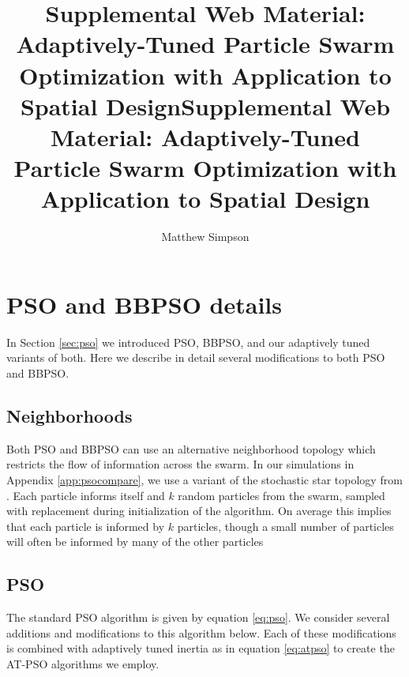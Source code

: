 \documentclass[cmbright]{staauth}
\begin{document}
\blind
{
  \title{Supplemental Web Material: Adaptively-Tuned Particle Swarm Optimization with Application to Spatial Design}
  \author{Matthew Simpson}
  \address{Department of Statistics, University of Missouri,\\
    146 Middlebush Hall, Columbia, MO 65211-6100}
  \received{}
  \accepted{}

}\fi
{}\blind
{
  \title{Supplemental Web Material: Adaptively-Tuned Particle Swarm Optimization with Application to Spatial Design}
  \author{}
  \address{}
  \corremail{}
  \received{}
  \accepted{}

}\fi

\maketitle

\appendix
\section{PSO and BBPSO details}\label{app:psodetail}

In Section \ref{sec:pso} we introduced PSO, BBPSO, and our adaptively tuned variants of both. Here we describe in detail several modifications to both PSO and BBPSO.

\subsection{Neighborhoods}
Both PSO and BBPSO can use an alternative neighborhood topology which restricts the flow of information across the swarm. In our simulations in Appendix \ref{app:psocompare}, we use a variant of the stochastic star topology from \cite{miranda2008stochastic}. Each particle informs itself and $k$ random particles from the swarm, sampled with replacement during initialization of the algorithm. On average this implies that each particle is informed by $k$ particles, though a small number of particles will often be informed by many of the other particles

\subsection{PSO}\label{subapp:pso}
The standard PSO algorithm is given by equation \eqref{eq:pso}. We consider several additions and modifications to this algorithm below. Each of these modifications is combined with adaptively tuned inertia as in equation \eqref{eq:atpso} to create the AT-PSO algorithms we employ.
\end{document}
